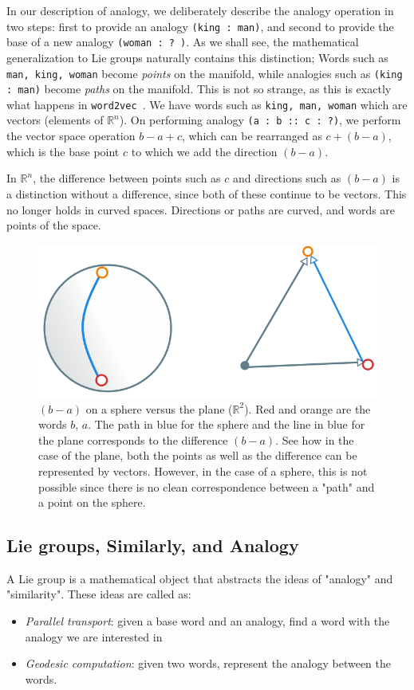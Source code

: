 \documentclass{book}
\newcommand{\wtov}{\texttt{word2vec }}
\newcommand{\R}{\ensuremath{\mathbb R}}
\begin{document}
In our description of analogy, we deliberately describe the analogy operation
in two steps: first to provide an analogy \texttt{(king : man)}, and second
to provide the base of a new analogy \texttt{(woman : ? )}. As we shall see,
the mathematical generalization to Lie groups naturally contains this distinction;
Words such as \texttt{man, king, woman} become \emph{points} on the manifold,
while analogies such as \texttt{(king : man)} become \emph{paths} on the manifold.
This is not so strange, as this is exactly what happens in \wtov. We have
words such as \texttt{king, man, woman} which are vectors (elements of $\R^n$). 
On performing analogy \texttt{(a : b :: c : ?)}, we perform the vector
space operation $b - a + c$, which can be rearranged as $c + (b - a)$, which
is the base point $c$ to which we add the direction $(b - a)$.

In $\R^n$, the difference between points such as $c$  and directions such as $(b - a)$
is a distinction without a difference, since both of these continue to be vectors.
This no longer holds in curved spaces. Directions or paths are curved,
and words are points of the space.

\begin{figure}
\includegraphics[width=\textwidth]{./sphere-shortest-path.png}
\caption{$(b - a)$ on a sphere versus the plane ($\R^2$). Red and
  orange are the words $b$, $a$. The path in blue for the sphere and the
  line in blue for the plane corresponds to the difference $(b - a)$. See
  how in the case of the plane, both the points as well as the difference can
  be represented by vectors. However, in the case of a sphere, this is
  not possible since there is no clean correspondence between a "path" and
  a point on the sphere.}
\end{figure}

\subsection{Lie groups, Similarly, and Analogy}
A Lie group is a mathematical object that abstracts the ideas of "analogy"
and "similarity". These ideas are called as:
\begin{itemize}
\item \emph{Parallel transport}: given a base word and an analogy, find a word with the analogy we are interested in
\item \emph{Geodesic computation}: given two words, represent the analogy between the words.
\end{itemize}
\end{document}
